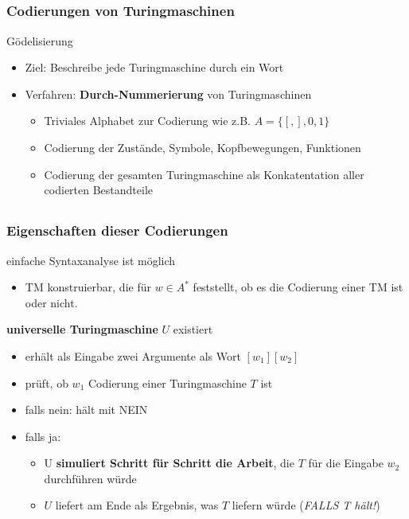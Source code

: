 \subsection*{}
\begin{frame}
  \frametitle{Codierungen von Turingmaschinen}

  \begin{block}{Gödelisierung}
\begin{itemize}
\pause
	\item Ziel: Beschreibe jede Turingmaschine durch ein Wort
	\pause
	\item Verfahren: \textbf{Durch-Nummerierung} von Turingmaschinen
\begin{itemize}
  \item Triviales Alphabet zur Codierung wie z.B. $A = \{[, ], 0, 1\}$
\pause
	\item Codierung der Zustände, Symbole, Kopfbewegungen, Funktionen
	\pause
	\item Codierung der gesamten Turingmaschine als Konkatentation aller codierten Bestandteile
\end{itemize}
\end{itemize}
   \end{block}
\end{frame}

\subsection*{}
\begin{frame}
  \frametitle{Eigenschaften dieser Codierungen}

  \begin{block}{einfache Syntaxanalyse ist möglich}
\begin{itemize}
	\item TM konstruierbar, die für $w \in A^*$ feststellt, ob es die Codierung einer TM ist oder nicht.
\end{itemize}
  \end{block}
  \pause
  \begin{block}{\textbf{universelle Turingmaschine} $U$ existiert}
\begin{itemize}
\pause
	\item erhält als Eingabe zwei Argumente als Wort $[w_1][w_2]$
	\pause
	\item prüft, ob $w_1$ Codierung einer Turingmaschine $T$ ist
	\pause
	\item falls nein: hält mit NEIN
	\pause
	\item falls ja:
	\pause
\begin{itemize}
	\item U \textbf{simuliert Schritt für Schritt die Arbeit}, die $T$ für die Eingabe $w_2$ durchführen würde
	\pause
	\item $U$ liefert am Ende als Ergebnis, was $T$ liefern würde (\textit{FALLS T hält!})
\end{itemize}
\end{itemize}
  \end{block}
\end{frame}


